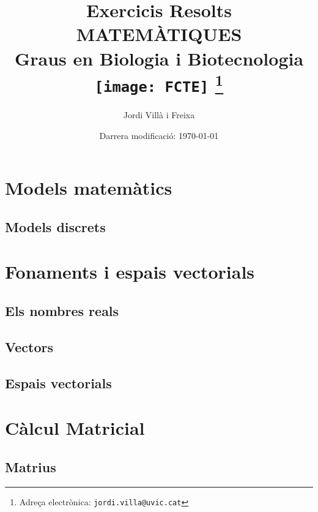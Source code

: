 \documentclass[12pt]{article}
\begin{document}
\title{Exercicis Resolts \\ \large MATEMÀTIQUES \\ Graus en Biologia i Biotecnologia \\[15pt] \texttt{[image: FCTE]}
\thanks{Adreça electrònica: \texttt{jordi.villa@uvic.cat}}}
\author{Jordi Villà i Freixa}
\date{Darrera modificació: \today}
\maketitle

\tableofcontents

\newpage


\begin{ExerciseList}
    \section{Models matemàtics}
    \subsection{Models discrets}
    
\section{Fonaments i espais vectorials}
\subsection{Els nombres reals}

\subsection{Vectors}







\subsection{Espais vectorials}






\section{Càlcul Matricial}
\subsection{Matrius}
 




\end{ExerciseList}
\end{document}
